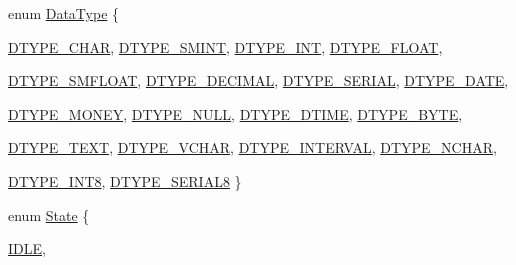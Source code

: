 \begin{DoxyCompactItemize}
\item 
enum \hyperlink{namespaceFgl_a221c9c0366d5227f8c27ca97308a691c}{DataType} \{ \par
\hyperlink{namespaceFgl_a221c9c0366d5227f8c27ca97308a691caa069ea13d4fbcc636513c861ffd5a0a5}{DTYPE\_\-CHAR}, 
\hyperlink{namespaceFgl_a221c9c0366d5227f8c27ca97308a691ca421150f5e460691473e3b73f5a4cff77}{DTYPE\_\-SMINT}, 
\hyperlink{namespaceFgl_a221c9c0366d5227f8c27ca97308a691caa65748cb8118299194b0e94c79f7ed16}{DTYPE\_\-INT}, 
\hyperlink{namespaceFgl_a221c9c0366d5227f8c27ca97308a691ca3de87e9ebd12d2a27e9f1c5548bbbb1e}{DTYPE\_\-FLOAT}, 
\par
\hyperlink{namespaceFgl_a221c9c0366d5227f8c27ca97308a691ca736541087aff0bdcf4de6b614fb1c7a8}{DTYPE\_\-SMFLOAT}, 
\hyperlink{namespaceFgl_a221c9c0366d5227f8c27ca97308a691ca0a3b34bf80b8d865c5144b70b05c20b2}{DTYPE\_\-DECIMAL}, 
\hyperlink{namespaceFgl_a221c9c0366d5227f8c27ca97308a691ca58d616b5ec3eb05985d54a84127247a9}{DTYPE\_\-SERIAL}, 
\hyperlink{namespaceFgl_a221c9c0366d5227f8c27ca97308a691ca955722507f475c645f9969b4f47ea62b}{DTYPE\_\-DATE}, 
\par
\hyperlink{namespaceFgl_a221c9c0366d5227f8c27ca97308a691ca1089d46b752ea5e60c0f8f028e32946a}{DTYPE\_\-MONEY}, 
\hyperlink{namespaceFgl_a221c9c0366d5227f8c27ca97308a691cadc944429d500699855ff8358744ccafe}{DTYPE\_\-NULL}, 
\hyperlink{namespaceFgl_a221c9c0366d5227f8c27ca97308a691ca5dfcdf2b603061f71e1e699d0a5fd00d}{DTYPE\_\-DTIME}, 
\hyperlink{namespaceFgl_a221c9c0366d5227f8c27ca97308a691ca95204b269b22456070e0d4b0a2d17878}{DTYPE\_\-BYTE}, 
\par
\hyperlink{namespaceFgl_a221c9c0366d5227f8c27ca97308a691ca1e6a347f34e3bacc5ffae6f68b66fb1f}{DTYPE\_\-TEXT}, 
\hyperlink{namespaceFgl_a221c9c0366d5227f8c27ca97308a691caeab8f048d690d7aff79e4f3414f57550}{DTYPE\_\-VCHAR}, 
\hyperlink{namespaceFgl_a221c9c0366d5227f8c27ca97308a691ca94656452eeee982084d5d07f731e083b}{DTYPE\_\-INTERVAL}, 
\hyperlink{namespaceFgl_a221c9c0366d5227f8c27ca97308a691caccc267cba325bd5a14f3abd6ccb7f1e2}{DTYPE\_\-NCHAR}, 
\par
\hyperlink{namespaceFgl_a221c9c0366d5227f8c27ca97308a691ca0d5037f242d7e0d535b4d82e98940b7a}{DTYPE\_\-INT8}, 
\hyperlink{namespaceFgl_a221c9c0366d5227f8c27ca97308a691cace841d25cf95ce64a624e7016f6001d5}{DTYPE\_\-SERIAL8}
 \}
\item 
enum \hyperlink{namespaceFgl_a66700792cb225549384ae76c1057cf22}{State} \{ \par
\hyperlink{namespaceFgl_a66700792cb225549384ae76c1057cf22a3a5aa8ccf2377dc2b3a6d965635a6eb6}{IDLE}, 

\end{DoxyCompactItemize}
